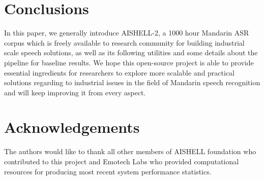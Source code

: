 \documentclass[a4paper]{article}
\begin{document}
% 

\section{Conclusions}

In this paper, we generally introduce AISHELL-2, a 1000 hour Mandarin ASR corpus which is freely available to research community for building industrial scale speech solutions, as well as its following utilities and some details about the pipeline for baseline results. We hope this open-source project is able to provide essential ingredients for researchers to explore more scalable and practical solutions regarding to industrial issues in the field of Mandarin speech recognition and will keep improving it from every aspect.

\section{Acknowledgements}

The authors would like to thank all other members of AISHELL foundation who contributed to this project and Emotech Labs who provided computational resources for producing most recent system performance statistics.




\end{document}
